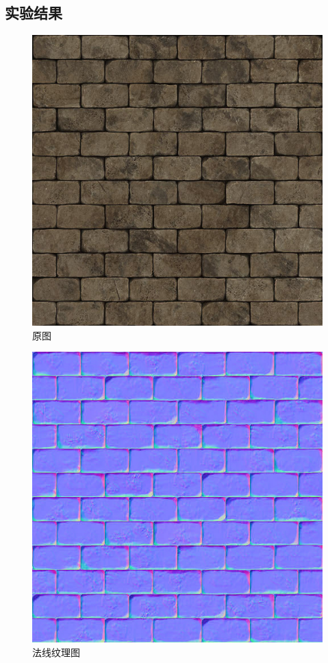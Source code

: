 \documentclass[11pt,UTF8]{article}
\begin{document}
\subsection{实验结果}
	\begin{figure}[H]
		\centering
		\includegraphics[width=\textwidth]{brickwall.jpg}
		\caption{原图}\label{original}
	\end{figure}

	\begin{figure}[H]
		\centering
		\includegraphics[width=\textwidth]{brickwall_normal.jpg}
		\caption{法线纹理图}\label{normal}
	\end{figure}	
\end{document}
